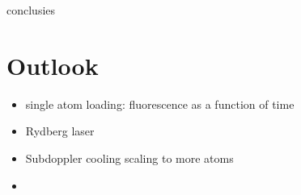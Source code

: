 conclusies

\section{Outlook}

\begin{itemize}
    \item single atom loading: fluorescence as a function of time
    \item Rydberg laser
    \item Subdoppler cooling scaling to more atoms
    \item 
\end{itemize}